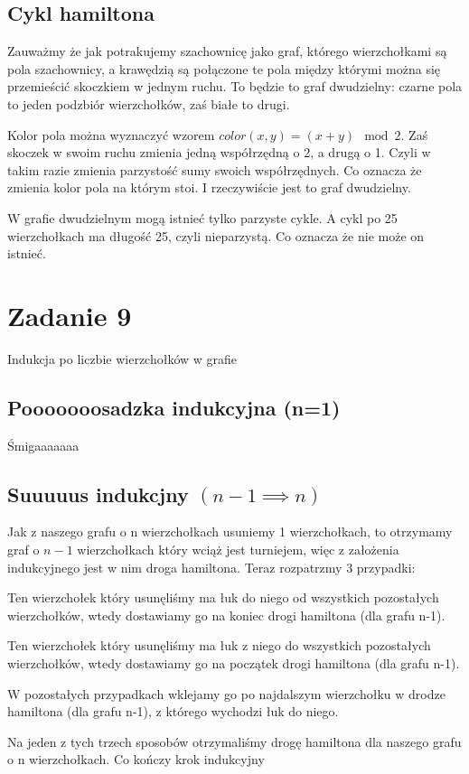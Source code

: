 \documentclass{article}
\begin{document}
\subsection*{Cykl hamiltona}
Zauważmy że jak potrakujemy szachownicę jako graf, którego wierzchołkami są pola szachownicy, a krawędzią są połączone te pola między którymi można się przemieścić skoczkiem w jednym ruchu. To będzie to graf dwudzielny: czarne pola to jeden podzbiór wierzchołków, zaś białe to drugi. 

Kolor pola można wyznaczyć wzorem $color(x,y) = (x+y) \mod 2$. Zaś skoczek w swoim ruchu zmienia jedną współrzędną o 2, a drugą o 1. Czyli w takim razie zmienia parzystość sumy swoich współrzędnych. Co oznacza że zmienia kolor pola na którym stoi. I rzeczywiście jest to graf dwudzielny.

W grafie dwudzielnym mogą istnieć tylko parzyste cykle. A cykl po 25 wierzchołkach ma długość 25, czyli nieparzystą. Co oznacza że nie może on istnieć.

\section*{Zadanie 9}
Indukcja po liczbie wierzchołków w grafie
\subsection*{Pooooooosadzka indukcyjna (n=1)}
Śmigaaaaaaa
\subsection*{Suuuuus indukcjny $(n-1 \implies n)$}
Jak z naszego grafu o n wierzchołkach usuniemy 1 wierzchołkach, to otrzymamy graf o $n-1$ wierzchołkach który wciąż jest turniejem, więc z założenia indukcyjnego jest w nim droga hamiltona. Teraz rozpatrzmy 3 przypadki:

Ten wierzchołek który usunęliśmy ma łuk do niego od wszystkich pozostałych wierzchołków, wtedy dostawiamy go na koniec drogi hamiltona (dla grafu n-1). 

Ten wierzchołek który usunęliśmy ma łuk z niego do wszystkich pozostałych wierzchołków, wtedy dostawiamy go na początek drogi hamiltona (dla grafu n-1). 

W pozostałych przypadkach wklejamy go po najdalszym wierzchołku w drodze hamiltona (dla grafu n-1), z którego wychodzi łuk do niego. 

Na jeden z tych trzech sposobów otrzymaliśmy drogę hamiltona dla naszego grafu o n wierzchołkach. Co kończy krok indukcyjny
\end{document}
